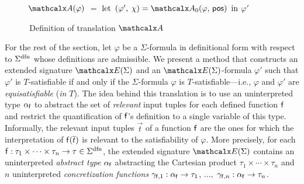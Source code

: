 \begin{figure}[t]
\begin{enumerate}
\begin{itemize}
\begin{itemize}
     \itemx[] \return {}
   \end{itemize}
 \end{itemize}
\end{enumerate}
\begin{enumerate}
\itemx[\ ]
$\conv( \varphi )$ $=$ $\textrm{let}$ $( \varphi',\, \chi ) = \conv_0( \varphi,\, \ppos )$ $\textrm{in}$ $\varphi'$
\\[-1.5\baselineskip] %
\end{enumerate}
\caption{\,Definition of translation $\conv$}
\label{fig:A}
\end{figure}

For the rest of the section, let $\varphi$ be a $\Sigma$-formula
in definitional form with respect to $\sfundefs{\Sigma}$
whose definitions are admissible.
We present a method that constructs an extended signature
$\extendsig{ \Sigma }$ and an $\extendsig{ \Sigma }$-formula $\varphi'$ such that
$\varphi'$ is $T$-satisfiable if and only if the $\Sigma$-formula $\varphi$ is
$T$-satisfiable---i.e., $\varphi$ and $\varphi'$ are \emph{equisatisfiable} (\emph{in $T$}).
The idea behind this translation is to use an uninterpreted type $\alpha_{\mathsf{f}}$
to abstract the set of
\emph{relevant} input tuples for each defined function $\mathsf{f}$ and restrict the
quantification of $\mathsf{f}$'s definition to a single variable of this type.
Informally, the relevant input tuples $\vec t$ of a function $\mathsf{f}$ are the
ones for which the interpretation of $\mathsf{f}( \overline{t} )$ is relevant to the
satisfiability of $\varphi$.
More precisely,
for each $\con{f} : \tau_1 \times \cdots \times \tau_n \rightarrow \tau \in \sfundefs{\Sigma}$,
the extended signature $\extendsig{\Sigma}$ contains
an uninterpreted \emph{abstract type} $\alpha_{\mathsf{f}}$ 
abstracting the Cartesian product $\tau_1 \times \cdots \times \tau_n$
and
$n$ uninterpreted \emph{concretization functions} $\gamma_{\mathsf{f},1} : \alpha_{\mathsf{f}} \rightarrow \tau_1$, $\dotsc,$ $\gamma_{\mathsf{f},n} : \alpha_{\mathsf{f}} \rightarrow \tau_n$.

